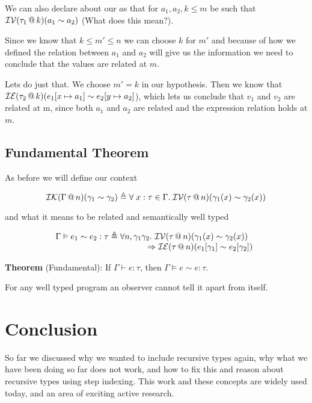 \documentclass{lecturenotes}
\makeatletter
\newcommand{\spa}{\mkern5mu}
\newcommand{\inval}[4]{\ensuremath{\mathcal{I}\mathcal{V}(#1 \mkern3mu @ \mkern3mu #2)(#3 \sim #4})}
\newcommand{\inexpr}[4]{\ensuremath{\mathcal{I}\mathcal{E}(#1 \mkern3mu @ \mkern3mu #2)(#3 \sim #4})}
\newcommand{\incntxt}[4]{\ensuremath{\mathcal{I}\mathcal{K}(#1\mkern3mu @ \mkern3mu #2)(#3 \sim #4})}
\makeatother
\begin{document}
  We can also declare about our $a$s that for $a_1, a_2, k \leq m$ be such that $\inval{\tau_1}{k}{a_1}{a_2}$ (What does this mean?). 

  Since we know that $k \leq m' \leq n$ we can choose $k$ for $m'$ and because of how we defined the relation between $a_1$ and $a_2$ will give us the information we need to conclude that the values are related at $m$.

  Lets do just that. We choose $m' = k$ in our hypothesis. 
    Then we know that \inexpr{\tau_2}{k}{e_1[x \mapsto a_1]}{e_2[y \mapsto a_2]}, which lets us conclude that $v_1$ and $v_2$ are related at m, since both $a_1$ and $a_2$ are related and the expression relation holds at $m$. 
 
\subsection{Fundamental Theorem}

As before we will define our context 

$$\incntxt{\Gamma}{n}{\gamma_1}{\gamma_2} \triangleq \forall \spa x : \tau \in \Gamma. \spa \inval{\tau}{n}{\gamma_1(x)}{\gamma_2(x)}$$

and what it means to be related and semantically well typed 

$$\begin{array}{r@{\;\triangleq\;}l} 
  \Gamma \vDash e_1 \sim e_2 : \tau 
    & \forall n, \gamma_1 \gamma_2.\, \hspace{-1.5em}
    \begin{array}[t]{l}\hspace{1.15em}
      \inval{\tau}{n}{\gamma_1(x)}{\gamma_2(x)} \\
      {} \Rightarrow \inexpr{\tau}{n}{e_1[\gamma_1]}{e_2[\gamma_2]}\\
    \end{array}  
\end{array}$$

\textbf{Theorem} (Fundamental): If $\Gamma \vdash e : \tau$, then $\Gamma \vDash e \sim e : \tau$. 

For any well typed program an observer cannot tell it apart from itself. 

\section{Conclusion}

So far we discussed why we wanted to include recursive types again, why what we have been doing so far does not work, and how to fix this and reason about recursive types using step indexing. 
  This work and these concepts are widely used today, and an area of exciting active research. 
\end{document}
